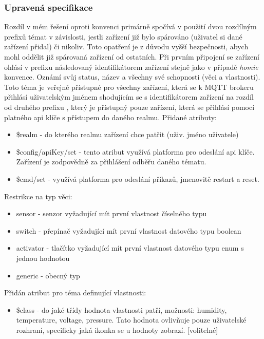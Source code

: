 \subsubsection{Upravená specifikace}
Rozdíl v mém řešení oproti  konvenci primárně spočívá v použití dvou rozdílným prefixů témat v závislosti, jestli zařízení již bylo spárováno (uživatel si dané zařízení přidal) či nikoliv. Toto opatření je z důvodu vyšší bezpečnosti, abych mohl oddělit již spárovaná zařízení od ostatních. Při prvním připojení se zařízení ohlásí v prefixu  následovaný identifikátorem zařízení stejně jako v případě \textit{homie} konvence. Oznámí svůj status, název a všechny své schopnosti (věci a vlastnosti). Toto téma je veřejně přístupné pro všechny zařízení, která se k MQTT brokeru přihlásí uživatelským jménem shodujícím se s identifikátorem zařízení na rozdíl od druhého prefixu , který je přístupný pouze zařízení, která se přihlásí pomocí platného api klíče s přístupem do daného realmu. Přidané atributy:
\begin{itemize}
    \item \$realm - do kterého realmu zařízení chce patřit (uživ. jméno uživatele)
    \item \$config/apiKey/set - tento atribut využívá platforma pro odeslání api klíče. Zařízení je zodpovědně za přihlášení odběřu daného tématu.
    \item \$cmd/set - využívá platforma pro odeslání příkazů, jmenovitě restart a reset.
\end{itemize}

Restrikce na typ věci:
\begin{itemize}
    \item sensor - senzor vyžadující mít první vlastnost číselného typu
    \item switch - přepínač vyžadující mít první vlastnost datového typu boolean
    \item activator - tlačítko vyžadující mít první vlastnost datového typu enum s jednou hodnotou
    \item generic - obecný typ
\end{itemize}

Přidán atribut pro téma definující vlastnosti:
\begin{itemize}
    \item \$class - do jaké třídy hodnota vlastnosti patří, možnosti: humidity, temperature, voltage, pressure. Tato hodnota ovlivňuje pouze uživatelské rozhraní, specificky jaká ikonka se u hodnoty zobrazí. [volitelné]
\end{itemize}


